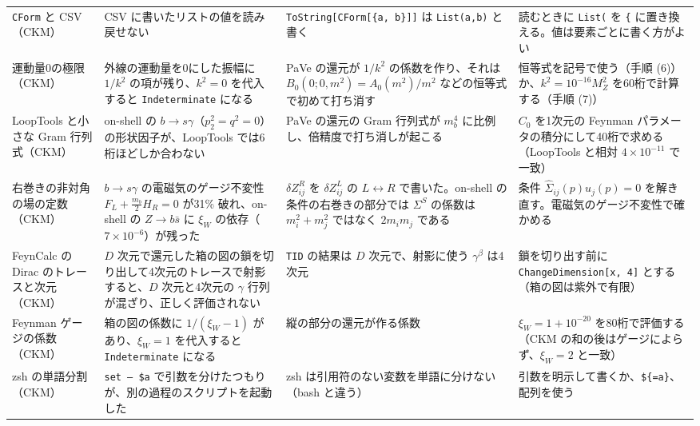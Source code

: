 \documentclass[a4paper,10pt]{ltjsarticle}
\begin{document}
\begin{table}[tbp]
\begin{tabularx}{\linewidth}{>{\raggedright\arraybackslash}p{2.4cm}>{\raggedright\arraybackslash}X>{\raggedright\arraybackslash}X>{\raggedright\arraybackslash}X}
\texttt{CForm} と CSV（CKM） & CSV に書いたリストの値を読み戻せない & \texttt{ToString[CForm[\{a, b\}]]} は \texttt{List(a,b)} と書く & 読むときに \texttt{List(} を \texttt{\{} に置き換える。値は要素ごとに書く方がよい \\
運動量0の極限（CKM） & 外線の運動量を0にした振幅に $1/k^2$ の項が残り、$k^2=0$ を代入すると \texttt{Indeterminate} になる & PaVe の還元が $1/k^2$ の係数を作り、それは $B_0(0;0,m^2)=A_0(m^2)/m^2$ などの恒等式で初めて打ち消す & 恒等式を記号で使う（手順 (6)）か、$k^2=10^{-16}M_Z^2$ を60桁で計算する（手順 (7)） \\
LoopTools と小さな Gram 行列式（CKM） & on-shell の $b\to s\gamma$（$p_2^2=q^2=0$）の形状因子が、LoopTools では6桁ほどしか合わない & PaVe の還元の Gram 行列式が $m_b^4$ に比例し、倍精度で打ち消しが起こる & $C_0$ を1次元の Feynman パラメータの積分にして40桁で求める（LoopTools と相対 $4\times10^{-11}$ で一致） \\
右巻きの非対角の場の定数（CKM） & $b\to s\gamma$ の電磁気のゲージ不変性 $F_L+\frac{m_b}2H_R=0$ が31\% 破れ、on-shell の $Z\to b\bar s$ に $\xi_W$ の依存（$7\times10^{-6}$）が残った & $\delta Z^R_{ij}$ を $\delta Z^L_{ij}$ の $L\leftrightarrow R$ で書いた。on-shell の条件の右巻きの部分では $\Sigma^S$ の係数は $m_i^2+m_j^2$ ではなく $2m_im_j$ である & 条件 $\hat\Sigma_{ij}(p)u_j(p)=0$ を解き直す。電磁気のゲージ不変性で確かめる \\
FeynCalc の Dirac のトレースと次元（CKM） & $D$ 次元で還元した箱の図の鎖を切り出して4次元のトレースで射影すると、$D$ 次元と4次元の $\gamma$ 行列が混ざり、正しく評価されない & \texttt{TID} の結果は $D$ 次元で、射影に使う $\gamma^\beta$ は4次元 & 鎖を切り出す前に \texttt{ChangeDimension[x, 4]} とする（箱の図は紫外で有限） \\
Feynman ゲージの係数（CKM） & 箱の図の係数に $1/(\xi_W-1)$ があり、$\xi_W=1$ を代入すると \texttt{Indeterminate} になる & 縦の部分の還元が作る係数 & $\xi_W=1+10^{-20}$ を80桁で評価する（CKM の和の後はゲージによらず、$\xi_W=2$ と一致） \\
zsh の単語分割（CKM） & \texttt{set -- \$a} で引数を分けたつもりが、別の過程のスクリプトを起動した & zsh は引用符のない変数を単語に分けない（bash と違う） & 引数を明示して書くか、\texttt{\$\{=a\}}、配列を使う \\
\bottomrule
\end{tabularx}
\end{table}
\end{document}
